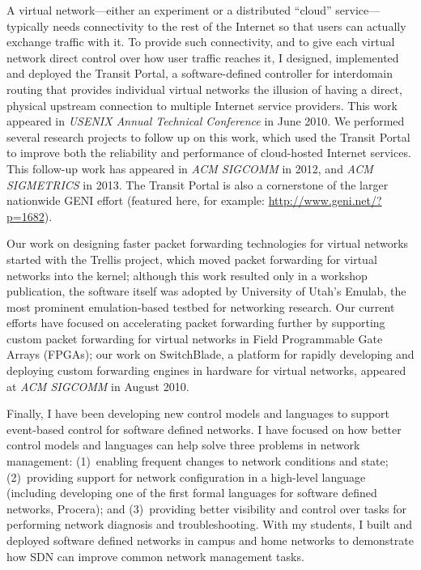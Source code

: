 \documentclass{article}
\begin{document}
A virtual network---either an experiment or a distributed ``cloud''
service---typically needs connectivity to the rest of the Internet so
that users can actually exchange traffic with it.  To provide such
connectivity, and to give each virtual network direct control over how
user traffic reaches it, I designed, implemented and deployed the
Transit Portal, a software-defined controller for interdomain routing
that provides individual virtual networks the illusion of having a
direct, physical upstream connection to multiple Internet service
providers.  This work appeared in {\em USENIX Annual Technical
Conference} in June 2010.  We performed several research projects to
follow up on this work, which used the Transit Portal to improve both
the reliability and performance of cloud-hosted Internet services.  This
follow-up work has appeared in {\em ACM SIGCOMM} in 2012, and {\em ACM
SIGMETRICS} in 2013.  The Transit Portal is also a cornerstone of the
larger nationwide GENI effort (featured here, for
example: \url{http://www.geni.net/?p=1682}).

Our work on designing faster packet forwarding technologies for virtual
networks started with the Trellis project, which moved packet forwarding
for virtual networks into the kernel; although this work resulted only
in a workshop publication, the software itself was adopted by University
of Utah's Emulab, the most prominent emulation-based testbed for
networking research.  Our current efforts have focused on accelerating
packet forwarding further by supporting custom packet forwarding for
virtual networks in Field Programmable Gate Arrays (FPGAs); our work on
SwitchBlade, a platform for rapidly developing and deploying custom
forwarding engines in hardware for virtual networks, appeared at {\em
ACM SIGCOMM} in August 2010.

Finally, I have been developing new control models and languages to
support event-based control for software defined networks.  I have
focused on how better control models and languages can help solve three
problems in network management: (1)~enabling frequent changes to network
conditions and state; (2)~providing support for network configuration in
a high-level language (including developing one of the first formal
languages for software defined networks, Procera); and (3)~providing
better visibility and control over tasks for performing network
diagnosis and troubleshooting.  With my students, I built and deployed
software defined networks in campus and home networks to demonstrate how
SDN can improve common network management tasks.  
\end{document}
